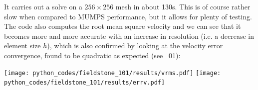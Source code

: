 It carries out a solve on a $256\times 256$ mesh in about 130s. 
This is of course rather slow when compared to 
MUMPS performance, but it allows for plenty of testing.
The code also computes the root mean square velocity and we can see that it 
becomes more and more accurate with 
an increase in resolution (i.e. a decrease in element size $h$), which is 
also confirmed by looking at the 
velocity error convergence, found to be quadratic as expected (see \stone~01):

\begin{center}
\texttt{[image: python\_codes/fieldstone\_101/results/vrms.pdf]}
\texttt{[image: python\_codes/fieldstone\_101/results/errv.pdf]}
\end{center}


